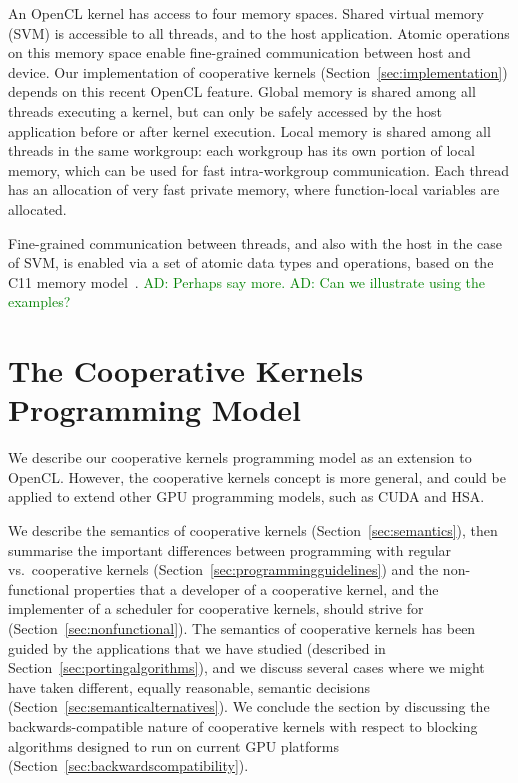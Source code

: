 \documentclass[nocopyrightspace]{sigplanconf-pldi16}
\newcommand{\ADComment}[1]{\textcolor{green}{AD: #1}}
\begin{document}
An OpenCL kernel has access to four memory spaces.  Shared virtual
memory (SVM) is accessible to all threads, and to the host
application.  Atomic operations on this memory space enable
fine-grained communication between host and device.  Our
implementation of cooperative kernels
(Section~\ref{sec:implementation}) depends on this recent OpenCL
feature.  Global memory is shared among all threads executing a
kernel, but can only be safely accessed by the host application before
or after kernel execution.  Local memory is shared among all threads
in the same workgroup: each workgroup has its own portion of local
memory, which can be used for fast intra-workgroup communication.
Each thread has an allocation of very fast private memory, where
function-local variables are allocated.

Fine-grained communication between threads, and also with the host in
the case of SVM, is enabled via a set of atomic data types and
operations, based on the C11 memory model~\cite{...}.
\ADComment{Perhaps say more.}  \ADComment{Can we illustrate using the
  examples?}


\section{The Cooperative Kernels Programming Model}\label{sec:cooperativekernels}

We describe our cooperative kernels programming model as an extension
to OpenCL.  However, the cooperative kernels concept is more general,
and could be applied to extend other GPU programming models, such as
CUDA and HSA.

We describe the semantics of cooperative kernels
(Section~\ref{sec:semantics}), then summarise the important
differences between programming with regular vs.\ cooperative kernels
(Section~\ref{sec:programmingguidelines}) and the non-functional
properties that a developer of a cooperative kernel, and the
implementer of a scheduler for cooperative kernels, should strive for
(Section~\ref{sec:nonfunctional}).  The semantics of cooperative
kernels has been guided by the applications that we have studied
(described in Section~\ref{sec:portingalgorithms}), and we discuss several cases where we
might have taken different, equally reasonable, semantic decisions (Section~\ref{sec:semanticalternatives}).
We conclude the section by discussing the backwards-compatible nature
of cooperative kernels with respect to blocking algorithms designed to
run on current GPU platforms
(Section~\ref{sec:backwardscompatibility}).
\end{document}
